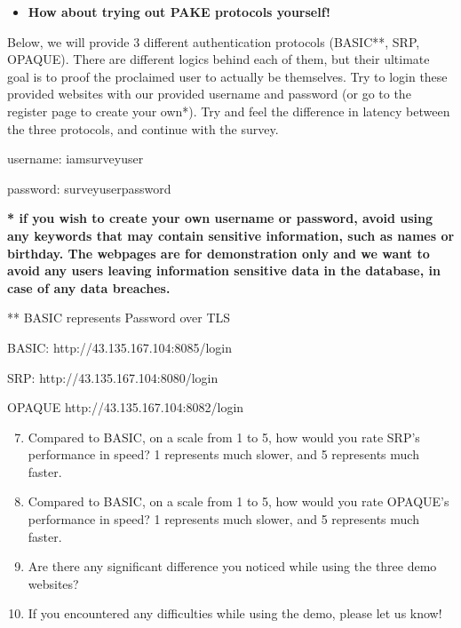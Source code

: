 \begin{itemize}
    \item \textbf{How about trying out PAKE protocols yourself!}
\end{itemize}
Below, we will provide 3 different authentication protocols (BASIC**, SRP, OPAQUE). There are different logics behind each of them, but their ultimate goal is to proof the proclaimed user to actually be themselves. Try to
login these provided websites with our provided username and password (or go to the register page to create your own*). Try and feel the difference in latency between the three protocols, and continue with the survey.

username: iamsurveyuser

password: surveyuserpassword

\textbf{* if you wish to create your own username or password, avoid using any keywords that may contain sensitive information, such as names or birthday. 
The webpages are for demonstration only and we want to avoid any users leaving information sensitive data in the database, in case of any data breaches.}

** BASIC represents Password over TLS

BASIC: http://43.135.167.104:8085/login

SRP: http://43.135.167.104:8080/login

OPAQUE http://43.135.167.104:8082/login

\begin{enumerate}
    \setcounter{enumi}{6}
    \item Compared to BASIC, on a scale from 1 to 5, how would you rate SRP's performance in speed? 1 represents much slower, and 5 represents much faster.
    \item Compared to BASIC, on a scale from 1 to 5, how would you rate OPAQUE's performance in speed? 1 represents much slower, and 5 represents much faster.
    \item Are there any significant difference you noticed while using the three demo websites?
    \item If you encountered any difficulties while using the demo, please let us know!
\end{enumerate}

